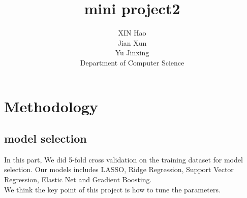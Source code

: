 \documentclass{article}
\title{mini project2}
\author{
  XIN Hao \\
  Jian Xun \\
  Yu Jinxing \\
  Department of Computer Science\\
}
\begin{document}

\maketitle



\section{Methodology}
%


\subsection{model selection}
In this part, We did 5-fold cross validation on the training dataset for model selection. Our models includes LASSO, Ridge Regression, Support Vector Regression, Elastic Net and Gradient Boosting. \\
We think the key point of this project is how to tune the parameters.
\end{document}

